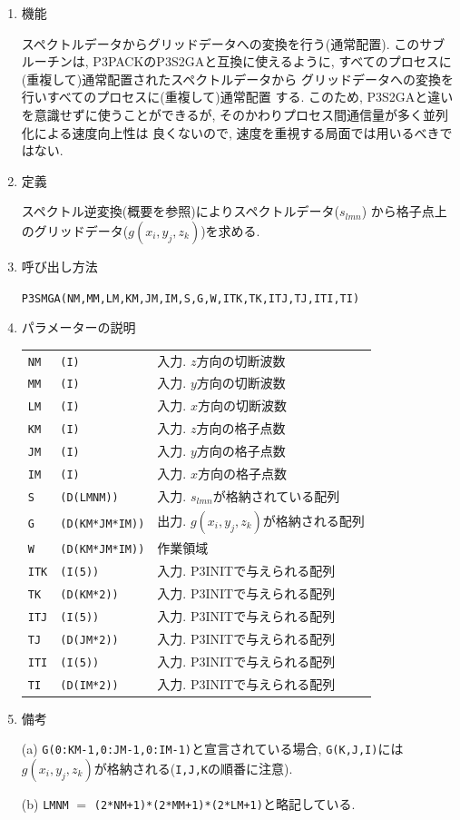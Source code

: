 \documentclass[a4j,fleqn]{jarticle}
\begin{document}
\begin{enumerate}

\item 機能 

スペクトルデータからグリッドデータへの変換を行う(通常配置).
このサブルーチンは, P3PACKのP3S2GAと互換に使えるように,
すべてのプロセスに(重複して)通常配置されたスペクトルデータから
グリッドデータへの変換を行いすべてのプロセスに(重複して)通常配置
する. このため, P3S2GAと違いを意識せずに使うことができるが,
そのかわりプロセス間通信量が多く並列化による速度向上性は
良くないので, 速度を重視する局面では用いるべきではない.

\item 定義

スペクトル逆変換(概要を参照)によりスペクトルデータ($s_{lmn}$)
から格子点上のグリッドデータ($g(x_i,y_j,z_k)$)を求める.

\item 呼び出し方法 

{\tt P3SMGA(NM,MM,LM,KM,JM,IM,S,G,W,ITK,TK,ITJ,TJ,ITI,TI)}
  
\item パラメーターの説明

\begin{tabular}{lll}
{\tt NM} & {\tt (I)} & 入力. $z$方向の切断波数\\
{\tt MM} & {\tt (I)} & 入力. $y$方向の切断波数\\
{\tt LM} & {\tt (I)} & 入力. $x$方向の切断波数\\
{\tt KM} & {\tt (I)} & 入力. $z$方向の格子点数\\
{\tt JM} & {\tt (I)} & 入力. $y$方向の格子点数\\
{\tt IM} & {\tt (I)} & 入力. $x$方向の格子点数\\
{\tt S} & {\tt (D(LMNM))} & 
                 入力. $s_{lmn}$が格納されている配列\\
{\tt G} & {\tt (D(KM*JM*IM))} & 出力. $g(x_i,y_j,z_k)$が格納される配列\\
{\tt W} & {\tt (D(KM*JM*IM))} & 作業領域\\
{\tt ITK} & {\tt (I(5))} & 入力. P3INITで与えられる配列\\
{\tt TK} & {\tt (D(KM*2))} & 入力. P3INITで与えられる配列\\
{\tt ITJ} & {\tt (I(5))} & 入力. P3INITで与えられる配列\\
{\tt TJ} & {\tt (D(JM*2))} & 入力. P3INITで与えられる配列\\
{\tt ITI} & {\tt (I(5))} & 入力. P3INITで与えられる配列\\
{\tt TI} & {\tt (D(IM*2))} & 入力. P3INITで与えられる配列
\end{tabular}

\item 備考

(a) {\tt G(0:KM-1,0:JM-1,0:IM-1)}と宣言されている場合, {\tt G(K,J,I)}には
    $g(x_i,y_j,z_k)$が格納される({\tt I,J,K}の順番に注意).
    
(b) {\tt LMNM} $=$ {\tt (2*NM+1)*(2*MM+1)*(2*LM+1)}と略記している.

\end{enumerate}
\end{document}
